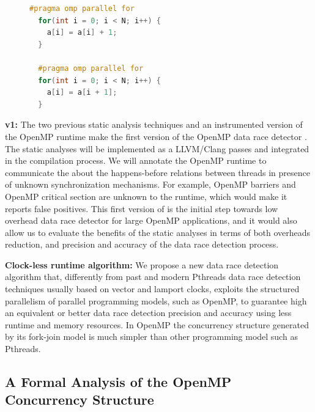 \begin{figure}
  \vspace{-2ex}
  \begin{lstlisting}[language=C++, caption=OpenMP loops with and without loop-carried data dependency., label=code:example01]
  #pragma omp parallel for
  for(int i = 0; i < N; i++) {
    a[i] = a[i] + 1;
  }

  #pragma omp parallel for
  for(int i = 0; i < N; i++) {
    a[i] = a[i + 1];
  }
  \end{lstlisting}
\end{figure}

\textbf{\archer v1:} The two previous static analysis techniques and an
instrumented version of the OpenMP runtime make the first version of the
OpenMP data race detector \archer.
%
The static analyses will be implemented as a LLVM/Clang passes and integrated
in the compilation process.
%
We will annotate the OpenMP runtime to communicate the \tsan about the
happens-before relations between threads in presence of unknown
synchronization mechanisms.
%
For example, OpenMP barriers and OpenMP critical section are unknown to the
\tsan runtime, which would make it reports false positives.
%
This first version of \archer is the initial step towards low overhead data
race detector for large OpenMP applications, and it would also allow us to
evaluate the benefits of the static analyses in terms of both overheads
reduction, and precision and accuracy of the data race detection process.

\textbf{Clock-less runtime algorithm:} We propose a new data race detection
algorithm that, differently from past and modern Pthreads data race detection
techniques usually based on vector and lamport clocks, exploits the structured
parallelism of parallel programming models, such as OpenMP, to guarantee high
an equivalent or better data race detection precision and accuracy using less
runtime and memory resources.
%
In OpenMP the concurrency structure generated by its fork-join model is much
simpler than other programming model such as Pthreads.

\subsection{A Formal Analysis of the OpenMP Concurrency Structure}
\label{subsec:opsem}


